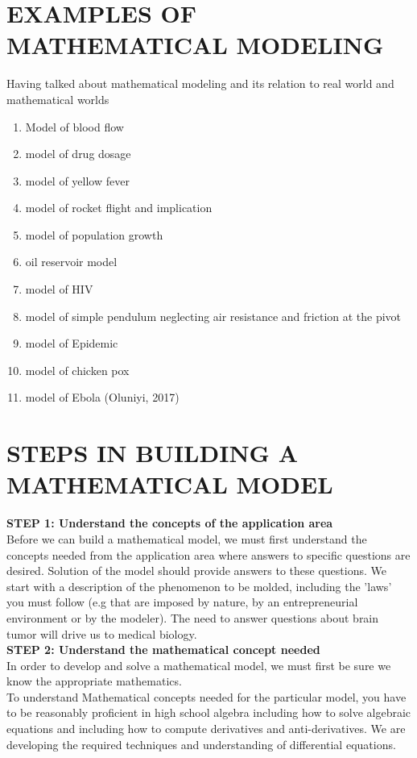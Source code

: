 \documentclass[12pt]{report}
\newcommand{\bt}[1]{\textbf{#1}}
\newcommand{\spn}[1]{\\[#1cm]}
\newcommand{\NI}{\noindent}
\begin{document}
	\section{EXAMPLES OF MATHEMATICAL MODELING}
	Having talked about mathematical modeling and its relation to real world and mathematical worlds
	\begin{enumerate}
		\item Model of blood flow
		\item model of drug dosage
		\item model of yellow fever
		\item model of rocket flight and implication
		\item model of population growth
		\item oil reservoir model
		\item model of HIV
		\item model of simple pendulum neglecting air resistance and friction at the pivot
		\item model of Epidemic
		\item model of chicken pox
		\item model of Ebola (Oluniyi, 2017)
	\end{enumerate}

	\section{STEPS IN BUILDING A MATHEMATICAL MODEL}
	\bt{STEP 1: Understand the concepts of the application area} \\
	Before we can build a mathematical model, we must first understand the concepts needed from the application area where answers to specific questions are desired. Solution of the model should provide answers to these questions. We start with a description of the phenomenon to be molded, including the 'laws' you must follow (e.g that are imposed by nature, by an entrepreneurial environment or by the modeler). The need to answer questions about brain tumor will drive us to medical biology.\\
	\newpage
	\NI\bt{STEP 2: Understand the mathematical concept needed}\\
	In order to develop and solve a mathematical model, we must first be sure we know the appropriate mathematics.\spn{0.4}
	To understand Mathematical concepts needed for the particular model, you have to be reasonably proficient in high school algebra including how to solve algebraic equations and including how to compute derivatives and anti-derivatives. We are developing the required techniques and understanding of differential equations.\\
	
\end{document}

